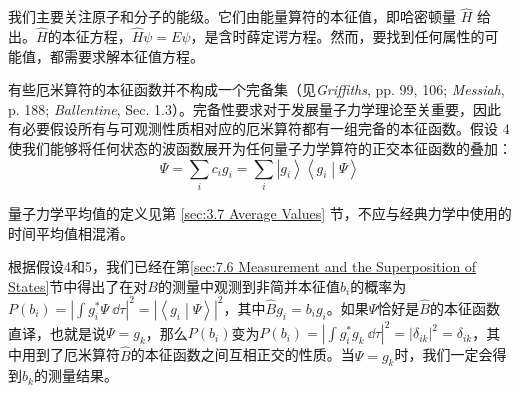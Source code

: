     我们主要关注原子和分子的能级。它们由能量算符的本征值，即哈密顿量 $\hat{H}$ 给出。$\hat{H}$的本征方程，$\hat{H}\psi = E\psi$，是含时薛定谔方程。然而，要找到任何属性的可能值，都需要求解本征值方程。

    \begin{center}
    \end{center}

    有些厄米算符的本征函数并不构成一个完备集（见\textit{Griffiths}, pp. 99, 106; \textit{Messiah}, p. 188; \textit{Ballentine}, Sec. 1.3）。完备性要求对于发展量子力学理论至关重要，因此有必要假设所有与可观测性质相对应的厄米算符都有一组完备的本征函数。假设 4 使我们能够将任何状态的波函数展开为任何量子力学算符的正交本征函数的叠加：
    \begin{equation}
        \Psi = \sum_{i}c_ig_i = \sum_{i}\left| g_i \right\rangle \left\langle g_i \middle| \Psi \right\rangle
        \label{eq:7.95}
    \end{equation}

    \begin{center}
    \end{center}

    量子力学平均值的定义见第 \ref{sec:3.7 Average Values} 节，不应与经典力学中使用的时间平均值相混淆。

    根据假设4和5，我们已经在第\ref{sec:7.6 Measurement and the Superposition of States}节中得出了在对$B$的测量中观测到非简并本征值$b_i$的概率为$P\left(b_i\right) = \left|\int g_i^{\ast}\Psi \: \dd \tau\right|^2 = \left|\left\langle g_i \middle| \Psi \right\rangle\right|^2$，其中$\hat{B}g_i = b_ig_i$。如果$\Psi$恰好是$\hat{B}$的本征函数直译，也就是说$\Psi = g_k$，那么$P\left(b_i\right)$变为$P\left(b_i\right) = \left|\int g_i^{\ast}g_k\:\dd \tau\right|^2 = \left|\delta_{ik}\right|^2 = \delta_{ik}$，其中用到了厄米算符$\hat{B}$的本征函数之间互相正交的性质。当$\Psi = g_k$时，我们一定会得到$b_k$的测量结果。

